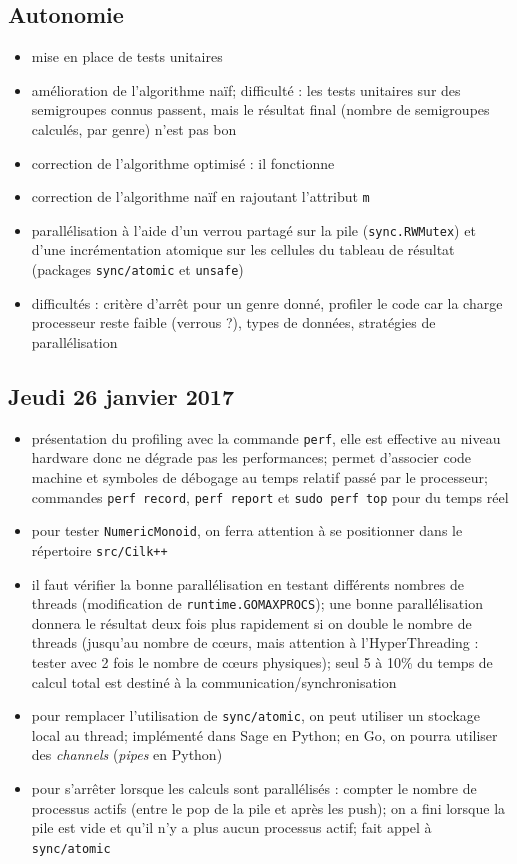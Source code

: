 \documentclass[12pt,a4paper]{report}
\begin{document}
\subsection*{Autonomie}
\begin{itemize}
	\item	mise en place de tests unitaires
	\item	amélioration de l'algorithme naïf; difficulté : les tests unitaires sur des semigroupes connus passent, mais le résultat final (nombre de semigroupes calculés, par genre) n'est pas bon
	\item	correction de l'algorithme optimisé : il fonctionne
	\item	correction de l'algorithme naïf en rajoutant l'attribut \texttt{m}
	\item	parallélisation à l'aide d'un verrou partagé sur la pile (\texttt{sync.RWMutex}) et d'une incrémentation atomique sur les cellules du tableau de résultat (packages \texttt{sync/atomic} et \texttt{unsafe})
	\item	difficultés : critère d'arrêt pour un genre donné, profiler le code car la charge processeur reste faible (verrous ?), types de données, stratégies de parallélisation
\end{itemize}

\subsection*{Jeudi 26 janvier 2017}
\begin{itemize}
	\item	présentation du profiling avec la commande \texttt{perf}, elle est effective au niveau hardware donc ne dégrade pas les performances; permet d'associer code machine et symboles de débogage au temps relatif passé par le processeur; commandes \texttt{perf record}, \texttt{perf report} et \texttt{sudo perf top} pour du temps réel
	\item	pour tester \texttt{NumericMonoid}, on ferra attention à se positionner dans le répertoire \texttt{src/Cilk++}
	\item	il faut vérifier la bonne parallélisation en testant différents nombres de threads (modification de \texttt{runtime.GOMAXPROCS}); une bonne parallélisation donnera le résultat deux fois plus rapidement si on double le nombre de threads (jusqu'au nombre de c\oe{}urs, mais attention à l'HyperThreading : tester avec 2 fois le nombre de c\oe{}urs physiques); seul 5 à 10\% du temps de calcul total est destiné à la communication/synchronisation
	\item	pour remplacer l'utilisation de \texttt{sync/atomic}, on peut utiliser un stockage local au thread; implémenté dans Sage en Python; en Go, on pourra utiliser des \emph{channels} (\emph{pipes} en Python)
	\item	pour s'arrêter lorsque les calculs sont parallélisés : compter le nombre de processus actifs (entre le pop de la pile et après les push); on a fini lorsque la pile est vide et qu'il n'y a plus aucun processus actif; fait appel à \texttt{sync/atomic}
\end{itemize}
\end{document}
